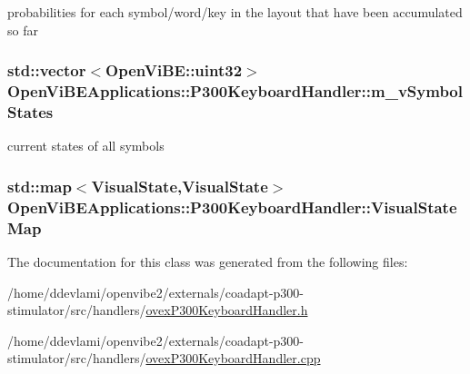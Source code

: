 \label{classOpenViBEApplications_1_1P300KeyboardHandler_a1ac93ed15de2fd151ec5bfaf5e71a607}
probabilities for each symbol/word/key in the layout that have been accumulated so far \hypertarget{classOpenViBEApplications_1_1P300KeyboardHandler_a07584e22150a0ab2940cdd7a04a9dc1a}{
\subsubsection[{m\_\-vSymbolStates}]{\setlength{\rightskip}{0pt plus 5cm}std::vector$<$OpenViBE::uint32$>$ {\bf OpenViBEApplications::P300KeyboardHandler::m\_\-vSymbolStates}}}
\label{classOpenViBEApplications_1_1P300KeyboardHandler_a07584e22150a0ab2940cdd7a04a9dc1a}
current states of all symbols \hypertarget{classOpenViBEApplications_1_1P300KeyboardHandler_a069a6e082d8a9a1d099fbcd7b06a9292}{
\subsubsection[{VisualStateMap}]{\setlength{\rightskip}{0pt plus 5cm}std::map$<${\bf VisualState},{\bf VisualState}$>$ {\bf OpenViBEApplications::P300KeyboardHandler::VisualStateMap}}}
\label{classOpenViBEApplications_1_1P300KeyboardHandler_a069a6e082d8a9a1d099fbcd7b06a9292}


The documentation for this class was generated from the following files:\begin{DoxyCompactItemize}
\item 
/home/ddevlami/openvibe2/externals/coadapt-\/p300-\/stimulator/src/handlers/\hyperlink{ovexP300KeyboardHandler_8h}{ovexP300KeyboardHandler.h}\item 
/home/ddevlami/openvibe2/externals/coadapt-\/p300-\/stimulator/src/handlers/\hyperlink{ovexP300KeyboardHandler_8cpp}{ovexP300KeyboardHandler.cpp}\end{DoxyCompactItemize}
